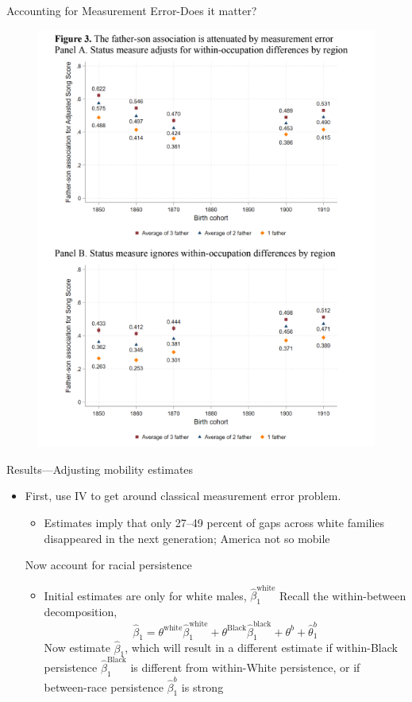 \documentclass[dvipsnames]{beamer}
\begin{document}
\begin{frame}{Accounting for Measurement Error-Does it matter?}
  \begin{figure}[htp]
    \centering
    \includegraphics[height=0.9\textheight, keepaspectratio=true]{ward_fig3.png}
  \end{figure}
\end{frame}
%
\begin{frame}{Results---Adjusting mobility estimates}
  \begin{itemize}
  \item First, use IV to get around classical measurement error problem.
    \begin{itemize}
    \item Estimates imply that only 27--49 percent of gaps across white families disappeared in the next generation; America not so mobile
    \end{itemize}
  \vitem Now account for racial persistence
    \begin{itemize}
    \item Initial estimates are only for white males, $\hat{\beta}_1^{\text{white}}$
    \vitem Recall the within-between decomposition,
      \[
\hat{\beta}_1 = \theta^\text{white}\hat{\beta}_1^\text{white} + \theta^\text{Black}\hat{\beta}_1^\text{black} + \theta^b + \hat{\theta}^b_1
\]
\vitem Now estimate $\hat{\beta}_1$, which will result in a different estimate if within-Black persistence $\hat{\beta}_1^\text{Black}$ is different from within-White persistence, or if between-race persistence $\hat{\beta}^b_1$ is strong
    \end{itemize}
  \end{itemize}
\end{frame}
\end{document}

